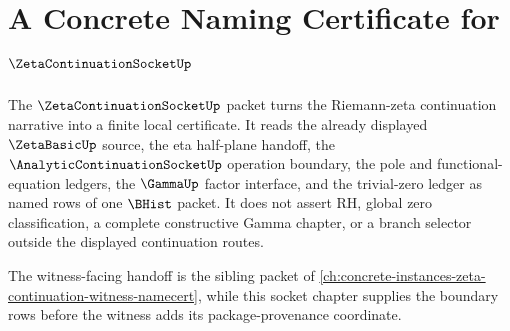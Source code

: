 \chapter{A Concrete Naming Certificate for $\ZetaContinuationSocketUp$}
\label{ch:concrete-instances-zeta-continuation-socket-namecert}

The $\ZetaContinuationSocketUp$ packet turns the Riemann-zeta continuation narrative into a finite local certificate. It reads the already displayed $\ZetaBasicUp$ source, the eta half-plane handoff, the $\AnalyticContinuationSocketUp$ operation boundary, the pole and functional-equation ledgers, the $\GammaUp$ factor interface, and the trivial-zero ledger as named rows of one $\BHist$ packet. It does not assert RH, global zero classification, a complete constructive Gamma chapter, or a branch selector outside the displayed continuation routes.

The witness-facing handoff is the sibling packet of \autoref{ch:concrete-instances-zeta-continuation-witness-namecert}, while this socket chapter supplies the boundary rows before the witness adds its package-provenance coordinate.

